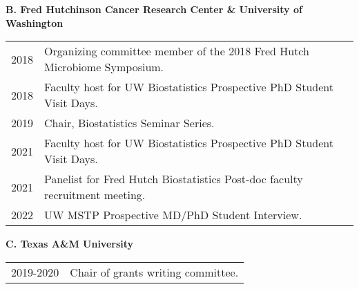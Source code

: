 \documentclass[10pt]{article}
\begin{document}
\textbf{B. Fred Hutchinson Cancer Research Center \& University of Washington}
\begin{table}[H]
\hskip0.9cm\begin{tabular}{p{1.6cm}p{12cm}}
2018 & Organizing committee member of the 2018 Fred Hutch Microbiome Symposium.\\
2018 & Faculty host for UW Biostatistics Prospective PhD Student Visit Days.\\
2019 & Chair, Biostatistics Seminar Series.\\
2021 & Faculty host for UW Biostatistics Prospective PhD Student Visit Days. \\
2021 & Panelist for Fred Hutch Biostatistics Post-doc faculty recruitment meeting.\\
2022 & UW MSTP Prospective MD/PhD Student Interview.
\end{tabular}
\end{table}


\textbf{C. Texas A\&M University }
\begin{table}[H]
\hskip0.9cm\begin{tabular}{p{1.6cm}p{12cm}}
2019-2020 & Chair of grants writing committee.
\end{tabular}
\end{table}
\end{document}
